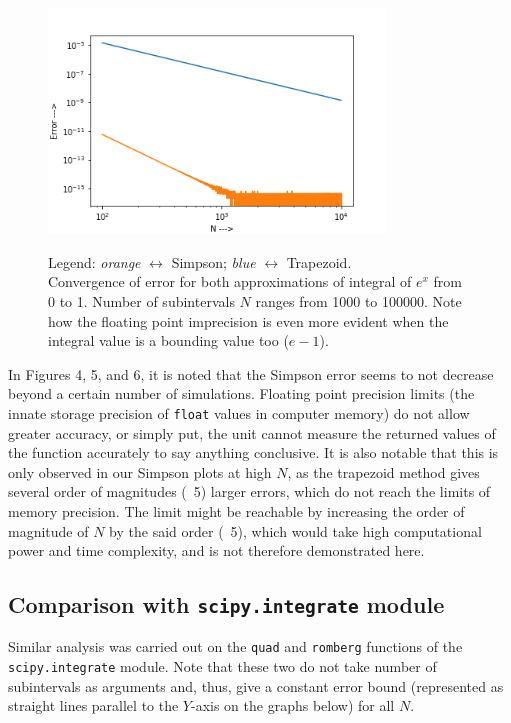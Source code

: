 \documentclass{report}
\begin{document}
\begin{figure}[H]
	\centering
	\includegraphics[width = 0.8\textwidth]{both1.png}
	\label{both1}
	\caption{Legend: \emph{orange} $\leftrightarrow$ Simpson; \emph{blue} $\leftrightarrow$ Trapezoid. \\Convergence of error for both approximations of integral of $e^x$ from 0 to 1. Number of subintervals $N$ ranges from 1000 to 100000. Note how the floating point imprecision is even more evident when the integral value is a bounding value too ($e -1$).}
\end{figure}


In Figures 4, 5, and 6, it is noted that the Simpson error seems to not decrease beyond a certain number of simulations. Floating point precision limits (the innate storage precision of \texttt{float} values in computer memory) do not allow greater accuracy, or simply put, the unit cannot measure the returned values of the function accurately to say anything conclusive. It is also notable that this is only observed in our Simpson plots at high $N$, as the trapezoid method gives several order of magnitudes (~5) larger errors, which do not reach the limits of memory precision. The limit might be reachable by increasing the order of magnitude of $N$ by the said order (~5), which would take high computational power and time complexity, and is not therefore demonstrated here.

\subsection*{Comparison with \texttt{scipy.integrate} module}
 Similar analysis was carried out on the \texttt{quad} and \texttt{romberg} functions of the \texttt{scipy.integrate} module. Note that these two do not take number of subintervals as arguments and, thus, give a constant error bound (represented as straight lines parallel to the $Y$-axis on the graphs below) for all $N$. 
 
\end{document}
